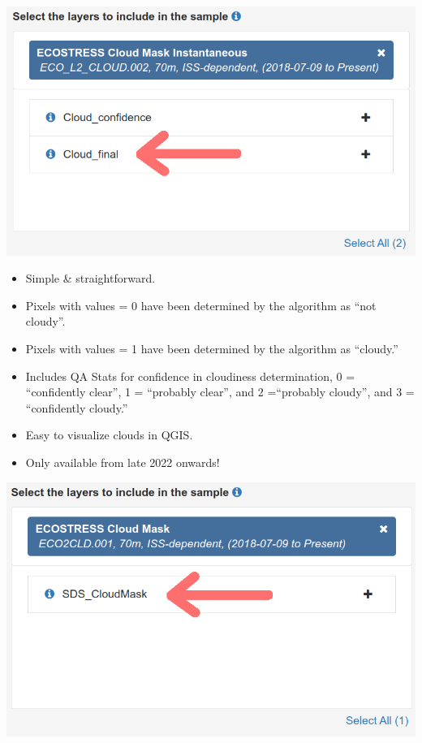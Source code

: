 \documentclass[oneside,a4paper,11pt,explicit]{book}
\begin{document}
	\begin{tcbraster}[raster columns=3, raster equal height, raster column skip=-.5mm]
		\begin{tcolorbox}[colback=yellow!5!white,colframe=IceCreamLeaf,
			colbacktitle=IceCreamLeaf,title=Cloud\_final]
			\begin{center}
				\includegraphics[width=\columnwidth]{Cloud_final.png}
			\end{center}
			\begin{itemize}[leftmargin=*]
				\item Simple \& straightforward.
				\item Pixels with values = 0 have been determined by the algorithm as ``not cloudy''.
				\item Pixels with values = 1 have been determined by the algorithm as ``cloudy.''
				\item Includes QA Stats for confidence in cloudiness determination, 0 = ``confidently clear'', 1 = ``probably clear'', and 2 =``probably cloudy'', and 3 = ``confidently cloudy.''
				\item Easy to visualize clouds in QGIS.
				\item Only available from late 2022 onwards!
			\end{itemize}
		\end{tcolorbox}
		\begin{tcolorbox}[colback=yellow!5!white,colframe=IceCreamLeaf, colbacktitle=IceCreamLeaf,title=SDS\_CloudMask]
			\begin{center}
				\includegraphics[width=\columnwidth]{SDS_CloudMask.png}

\end{center}
\end{tcolorbox}
\end{tcbraster}
\end{document}
